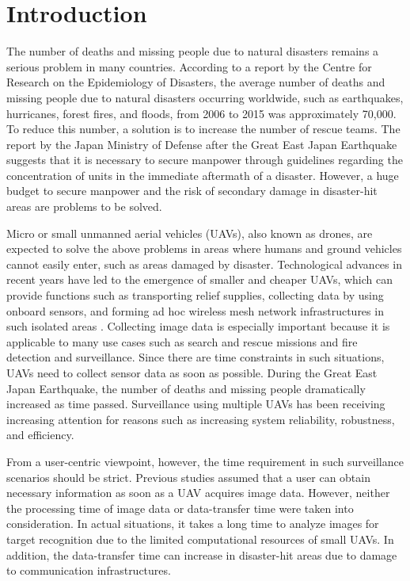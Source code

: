 \documentclass{ieeeaccess}
\begin{document}
\maketitle
\IEEEpeerreviewmaketitle

\section{Introduction}\label{intro}
The number of deaths and missing people due to natural disasters remains a serious problem in many countries. According to a report by the Centre for Research on the Epidemiology of Disasters\cite{CRED2016}, the average number of deaths and missing people due to natural disasters occurring worldwide, such as earthquakes, hurricanes, forest fires, and floods, from 2006 to 2015 was approximately 70,000. 
To reduce this number, a solution is to increase the number of rescue teams. The report by the Japan Ministry of Defense after the Great East Japan Earthquake suggests that it is necessary to secure manpower through guidelines regarding the concentration of units in the immediate aftermath of a disaster. However, a huge budget to secure manpower and the risk of secondary damage in disaster-hit areas are problems to be solved\cite{disaster2011}. 

Micro or small unmanned aerial vehicles (UAVs), also known as drones, are expected to solve the above problems in areas where humans and ground vehicles cannot easily enter, such as areas damaged by disaster. Technological advances in recent years have led to the emergence of smaller and cheaper UAVs, which can provide functions such as transporting relief supplies, collecting data by using onboard sensors, and forming ad hoc wireless mesh network infrastructures in such isolated areas \cite{Andre2014,Erdelj2016,Felice2014}. 
Collecting image data is especially important because it is applicable to many use cases such as search and rescue missions and fire detection and surveillance. Since there are time constraints in such situations, UAVs need to collect sensor data as soon as possible. 
During the Great East Japan Earthquake, the number of deaths and missing people dramatically increased as time passed\cite{japan2011}. 
Surveillance using multiple UAVs has been receiving increasing attention for reasons such as increasing system reliability, robustness, and efficiency\cite{Lanillos2014,Maza2007,Meng2014,chang2016,Mirzaei2011}.

From a user-centric viewpoint, however, the time requirement in such surveillance scenarios should be strict. Previous studies assumed that a user can obtain necessary information as soon as a UAV acquires image data. However, neither the processing time of image data or data-transfer time were taken into consideration. In actual situations, it takes a long time to analyze images for target recognition due to the limited computational resources of small UAVs. In addition, the data-transfer time can increase in disaster-hit areas due to damage to communication infrastructures.
\end{document}
